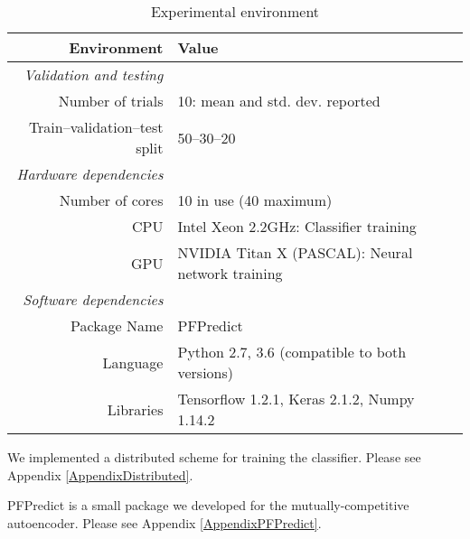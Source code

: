 \begin{table}[!h]
  \centering
  \caption{Experimental environment}
  \label{exp:implementation}
  \begin{threeparttable}
  \begin{tabular}{@{}rp{}@{}}
      \toprule
      Environment                    & Value                                             \\ \midrule
      \textit{Validation and testing}                                                    \\
      Number of trials               & 10: mean and std. dev. reported                   \\
      Train--validation--test split  & 50--30--20                                        \\ \cmidrule{1-2}
      \textit{Hardware dependencies}                                                     \\
      Number of cores\tnote{1}       & 10 in use (40 maximum)                            \\
      CPU                            & Intel Xeon 2.2GHz: Classifier training            \\
      GPU                            & NVIDIA Titan X (PASCAL): Neural network training  \\ \cmidrule{1-2} 
      \textit{Software dependencies}                                                     \\
      Package Name                   & PFPredict\tnote{2}                                \\
      Language                & Python 2.7, 3.6 (compatible to both versions)            \\
      Libraries               & Tensorflow 1.2.1, Keras 2.1.2, Numpy 1.14.2              \\ \bottomrule
  \end{tabular}
  \begin{tablenotes}
    \footnotesize
    \item[1] We implemented a distributed scheme for training the classifier.
    Please see Appendix \ref{AppendixDistributed}.
    \item[2] PFPredict is a small package we developed for the mutually-competitive autoencoder.
    Please see Appendix \ref{AppendixPFPredict}.
  \end{tablenotes}
  \end{threeparttable}
\end{table}

